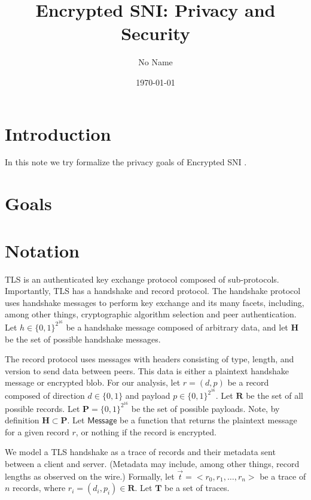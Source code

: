 \documentclass{article}
\title{Encrypted SNI: Privacy and Security}
\author{No Name}
\date{\today}
\theoremstyle{definition}
\begin{document}
\maketitle

\section{Introduction}

In this note we try formalize the privacy goals of Encrypted SNI \cite{ietf-tls-esni-04}.

\section{Goals}


\section{Notation}

TLS is an authenticated key exchange protocol composed of sub-protocols. Importantly, TLS has
a handshake and record protocol. The handshake protocol uses handshake messages to perform
key exchange and its many facets, including, among other things, cryptographic algorithm
selection and peer authentication. Let $h \in \{0,1\}^{2^{16}}$ be a handshake message 
composed of arbitrary data, and let $\mathbf{H}$ be the set of possible handshake messages.

The record protocol uses messages with headers consisting 
of type, length, and version to send data between peers. This data is either a plaintext 
handshake message or encrypted blob. For our analysis, let $r = (d, p)$ be a 
record composed of direction $d \in \{0,1\}$ and payload $p \in \{0,1\}^{2^{16}}$. Let
$\mathbf{R}$ be the set of all possible records. Let $\mathbf{P} = \{0,1\}^{2^{16}}$ 
be the set of possible payloads. Note, by definition $\mathbf{H} \subset \mathbf{P}$.
Let $\mathsf{Message}$ be a function that returns the plaintext message for a given
record $r$, or nothing if the record is encrypted.

We model a TLS handshake as a trace of records and their metadata sent between a client and server. 
(Metadata may include, among other things, record lengths as observed on the wire.) 
Formally, let $\vec{t} = <r_0, r_1, \dots, r_n>$ be a trace of $n$ records, where 
$r_i = (d_i, p_i) \in \mathbf{R}$. Let $\mathbf{T}$ be a set of traces. 
\end{document}
